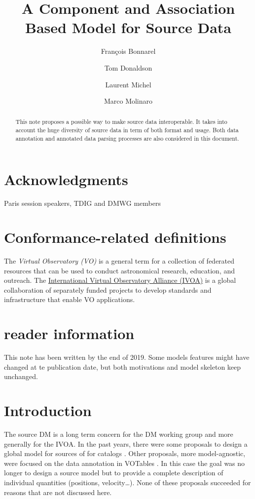\documentclass[11pt,a4paper]{ivoa}
\title{A Component and Association Based Model for Source Data}
\author[http://wiki.ivoa.net/twiki/bin/view/IVOA/FrancoisBonnarel]{François Bonnarel}
\author[http://wiki.ivoa.net/twiki/bin/view/IVOA/TomDonaldson]{Tom Donaldson}
\author[http://wiki.ivoa.net/twiki/bin/view/IVOA/LaurentMichel]{Laurent Michel}
\author[http://wiki.ivoa.net/twiki/bin/view/IVOA/MarcoMolinaro]{Marco Molinaro}
\begin{document}
\begin{abstract}
This note proposes a possible way to make source data interoperable. It takes into account the huge diversity of source data in term of both format and usage. Both data annotation and annotated data parsing processes are also considered in this document.
\end{abstract}


\section*{Acknowledgments}

Paris session speakers, TDIG and DMWG members

\section*{Conformance-related definitions}


The \emph{Virtual Observatory (VO)} is a
general term for a collection of federated resources that can be used
to conduct astronomical research, education, and outreach.
The \href{http://www.ivoa.net}{International
Virtual Observatory Alliance (IVOA)} is a global
collaboration of separately funded projects to develop standards and
infrastructure that enable VO applications.

\section*{reader information}
This note has been written by the end of 2019. Some models features might have changed at te publication date, but both motivations and model skeleton keep unchanged.

\section{Introduction}

The source DM is a long term concern for the DM working group and more generally for the IVOA.
In the past years, there were some proposals to design a global model for sources \citep{wd:jesusdm} of for catalogs \citep{wd:catalog}.
Other proposals, more model-agnostic, were focused on the data annotation in VOTables \citep{note:stcvot} \citep{note:seb}. In this case the goal was no longer to design a source model but to provide a complete description of  individual quantities (positions, velocity…).
None of these proposals succeeded for reasons that are not discussed here. 
\end{document}
